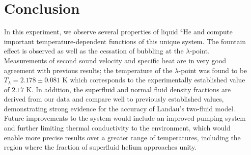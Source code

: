 
\section{Conclusion}\label{conclusion}

In this experiment, we observe several properties of liquid $^4$He and
compute important temperature-dependent functions of this unique
system. The fountain effect is observed as well as the cessation of
bubbling at the $\lambda$-point. Measurements of second sound
velocity and specific heat are in very good agreement with previous
results; the temperature of the $\lambda$-point was found to be
$T_{\lambda} = 2.178 \pm 0.081$ K which corresponds to the
experimentally established value of $2.17$ K. In addition, the
superfluid and normal fluid density fractions are derived from our
data and compare well to previously established values, demonstrating strong evidence for the accuracy of Landau's two-fluid model. Future
improvements to the system would include an improved pumping system
and further limiting thermal conductivity to the environment, which
would enable more precise results over a greater range of
temperatures, including the region where the fraction of superfluid helium approaches unity.


